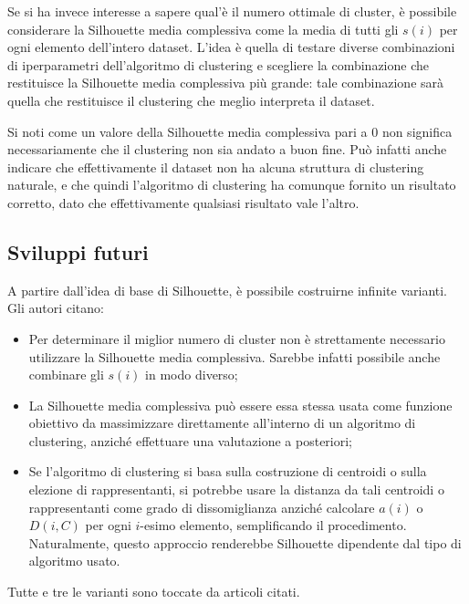 \documentclass[italian]{article}
\begin{document}
			Se si ha invece interesse a sapere qual'è il numero ottimale di
			cluster, è possibile considerare la Silhouette media complessiva
			come la media di tutti gli $s(i)$ per ogni elemento dell'intero
			dataset. L'idea è quella di testare diverse combinazioni di
			iperparametri dell'algoritmo di clustering e scegliere la
			combinazione che restituisce la Silhouette media complessiva più
			grande: tale combinazione sarà quella che restituisce il clustering
			che meglio interpreta il dataset.


			Si noti come un valore della Silhouette media complessiva
			pari a $0$ non significa necessariamente che il clustering
			non sia andato a buon fine. Può infatti anche indicare che
			effettivamente il dataset non ha alcuna struttura di clustering
			naturale, e che quindi l'algoritmo di clustering ha comunque
			fornito un risultato corretto, dato che effettivamente qualsiasi
			risultato vale l'altro.

		\subsection{Sviluppi futuri}

			A partire dall'idea di base di Silhouette, è possibile costruirne
			infinite varianti. Gli autori citano:

			\begin{itemize}
				\item
				Per determinare il miglior numero di cluster non è strettamente
				necessario utilizzare la Silhouette media complessiva. Sarebbe
				infatti possibile anche combinare gli $s(i)$ in modo diverso;
				\item
				La Silhouette media complessiva può essere essa stessa usata
				come funzione obiettivo da massimizzare direttamente all'interno
				di un algoritmo di clustering, anziché effettuare una valutazione
				a posteriori;
				\item
				Se l'algoritmo di clustering si basa sulla costruzione di centroidi
				o sulla elezione di rappresentanti, si potrebbe usare la distanza
				da tali centroidi o rappresentanti come grado di dissomiglianza
				anziché calcolare $a(i)$ o $D(i, C)$ per ogni $i$-esimo elemento,
				semplificando il procedimento. Naturalmente, questo approccio
				renderebbe Silhouette dipendente dal tipo di algoritmo usato. 
			\end{itemize}

			Tutte e tre le varianti sono toccate da articoli citati.
\end{document}
